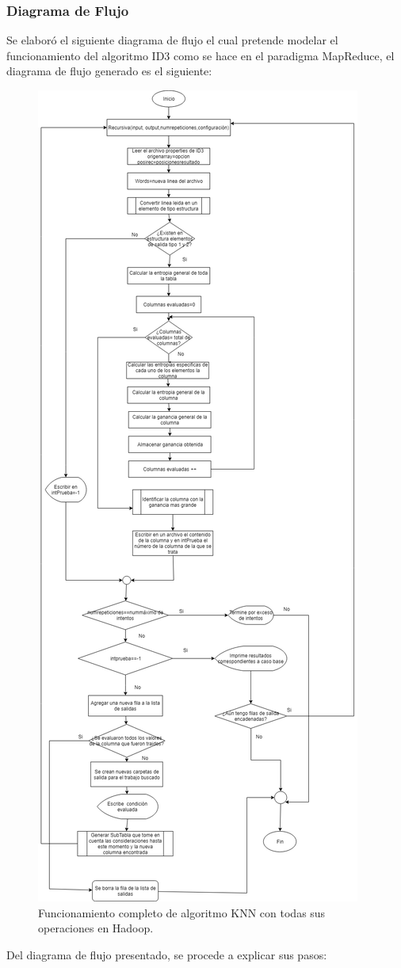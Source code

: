 \subsubsection{Diagrama de Flujo}
Se elaboró el siguiente diagrama de flujo el cual pretende modelar el funcionamiento del algoritmo ID3 como se hace en el paradigma MapReduce, el diagrama de flujo generado es el siguiente:
\\
\begin{figure}[H]
	\begin{center}
		\hypertarget{fig:flujo}{\hspace{1pt}}
		\includegraphics[width=.55\textwidth]{capitulo4a/images/ID3.png}
		\caption{Funcionamiento completo de algoritmo KNN con todas sus operaciones en Hadoop.}
		\label{fig:flujo}
	\end{center}
\end{figure}
Del diagrama de flujo presentado, se procede a explicar sus pasos:
